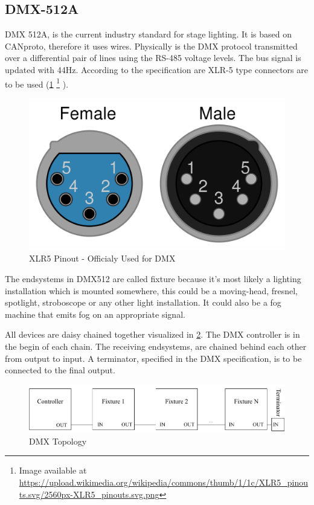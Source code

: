 \subsection*{DMX-512A}
\ac{DMX} 512A, is the current industry standard for stage lighting. It is based on \ac{CANproto}, therefore it uses wires.
Physically is the DMX protocol transmitted over a differential pair of lines using the RS-485 voltage levels. 
The bus signal is updated with 44Hz.
According to the specification are XLR-5 type connectors are to be used (\cref{fig:xlr}
\footnote{Image available at \url{https://upload.wikimedia.org/wikipedia/commons/thumb/1/1c/XLR5_pinouts.svg/2560px-XLR5_pinouts.svg.png}}
).

\begin{figure}[h]
	\centering
	\includegraphics[trim={0 0 0 0.0cm}, clip, scale=0.05]{figures/XLR_stecker.png}
	\caption{XLR5 Pinout - Officialy Used for DMX}
	\label{fig:xlr}
\end{figure}

The endsystems in DMX512 are called fixture because it's most likely a lighting installation which is mounted somewhere, 
this could be a moving-head, fresnel, spotlight, stroboscope or any other light installation.
It could also be a fog machine that emits fog on an appropriate signal.

All devices are daisy chained together visualized in \ref{fig:dmx_diagram}.
The DMX controller is in the begin of each chain.
The receiving endsystems, are chained behind each other from output to input. 
A terminator, specified in the DMX specification, is to be connected to the final output.
 

\begin{figure}[h]
	\centering
	\includegraphics[scale=0.6]{figures/DMX_blockdiagram.pdf}
	\caption{DMX Topology}
	\label{fig:dmx_diagram}
\end{figure}

